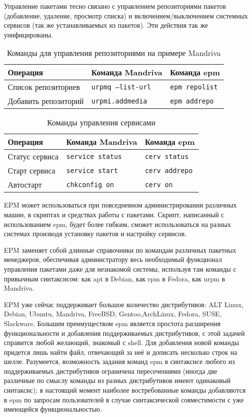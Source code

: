 \documentclass[10pt, a5paper]{article}
\def\vv!#1!{\texttt{#1}}
\begin{document}
Управление пакетами тесно связано с управлением репозиториями пакетов (добавление, удаление, просмотр списка) и включением/выключением системных сервисов (так же устанавливаемых из пакетов). Эти действия так же унифицированы.

\begin{table}
  \centering
  \small
  \begin{tabular}{l|l|l}
    \hline
    Операция & Команда Mandriva & Команда epm \\
    \hline
    Список репозиториев & \vv!urpmq --list-url! & \vv!epm repolist! \\
    Добавить репозиторий & \vv!urpmi.addmedia! & \vv!epm addrepo! \\
    \hline
  \end{tabular}
  \caption{Команды для управления репозиториями на примере Mandriva}
\end{table}

\begin{table}[h]
  \centering
  \small
  \begin{tabular}{l|l|l}
    \hline
    Операция & Команда Mandriva & Команда epm \\
    \hline
    Статус сервиса & \vv!service status! & \vv!cerv status! \\
    Старт сервиса & \vv!service start! & \vv!cerv addrepo! \\
    Автостарт & \vv!chkconfig on! & \vv!cerv on! \\
    \hline
  \end{tabular}
  \caption{Команды управления сервисами}
\end{table}

EPM может использоваться при повседневном администрировании различных машин, в скриптах и средствах работы с пакетами. Скрипт, написанный с использованием epm, будет более гибким, сможет использоваться на разных системах производя установку пакетов и настройку сервисов.

EPM заменяет собой длинные справочники по командам различных пакетных менеджеров, обеспечивая администратору весь необходимый функционал управления пакетами даже для незнакомой системы, используя там команды с привычным синтаксисом: как apt в Debian, как rpm в Fedora, как urpm в Mandriva.

EPM уже сейчас поддерживает большое количество дистрибутивов: ALT Linux, Debian, Ubuntu, Mandriva, FreeBSD, Gentoo,\linebreak ArchLinux, Fedora, SUSE, Slackware. Большим преимуществом epm является простота расширения функциональности и добавления поддерживаемых  дистрибутивов, с этой задачей справится любой желающий, знакомый с shell. Для добавления новой команды придется лишь найти файл, отвечающий за неё и дописать несколько строк на шелле.
Разумеется, возможность задания команд epm в синтаксисе любого из поддерживаемых дистрибутивов ограничена пересечениями (иногда две различные по смыслу команды из разных дистрибутивов имеют одинаковый синтаксис); в настоящий момент наиболее востребованные команды добавляются в epm по запросам пользователей в случае синтаксической совместимости с уже имеющейся функциональностью.
\end{document}
